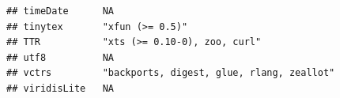 \documentclass[]{article}
\begin{document}
\begin{verbatim}
## timeDate      NA                                                                                                                                                                                                                                                                                                                                                                                                                                                                                    
## tinytex       "xfun (>= 0.5)"                                                                                                                                                                                                                                                                                                                                                                                                                                                                       
## TTR           "xts (>= 0.10-0), zoo, curl"                                                                                                                                                                                                                                                                                                                                                                                                                                                          
## utf8          NA                                                                                                                                                                                                                                                                                                                                                                                                                                                                                    
## vctrs         "backports, digest, glue, rlang, zeallot"                                                                                                                                                                                                                                                                                                                                                                                                                                             
## viridisLite   NA                                                                                                                                                                                                                                                                                                                                                                                                                                                                                    

\end{verbatim}
\end{document}
